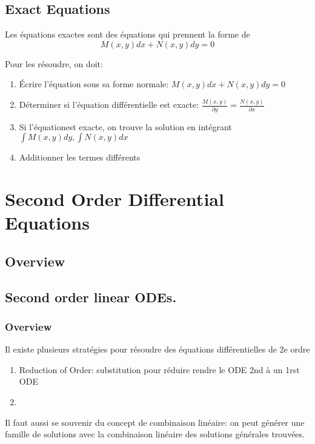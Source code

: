 \documentclass{article}
\begin{document}
\subsection{Exact Equations}

Les équations exactes sont des équations qui prennent la forme de
$$ M(x,y) dx + N(x,y) dy =0$$

Pour les résoudre, on doit:
\begin{enumerate}
    \item Écrire l'équation sous sa forme normale:
	$ M(x,y) dx + N(x,y) dy =0$
    \item Déterminer si l'équation différentielle est exacte:
	$ \frac{M(x,y)}{\partial y} = \frac{N(x,y)}{\partial x} $
    \item Si l'équationest exacte, on trouve la solution en intégrant
	$ \int M(x,y) dy, \int N(x,y) dx$
    \item Additionner les termes différents
\end{enumerate}

\section{Second Order Differential Equations}
\subsection*{Overview}

\subsection{Second order linear ODEs.}

\subsubsection{Overview}%
\label{ssub:Overview}

Il existe plusieurs stratégies pour résoudre des équations différentielles
de 2e ordre
\begin{enumerate}
    \item Reduction of Order: substitution pour réduire rendre le ODE 2nd
	à un 1rst ODE
    \item
\end{enumerate}

Il faut aussi se souvenir du concept de combinaison linéaire: on peut
générer une famille de solutions avec la combinaison linéaire des
solutions générales trouvées.
\end{document}
